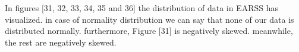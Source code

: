 \documentclass[letterpaper, 10 pt, conference]{ieeeconf}
\begin{document}
\begin{figure}[!ht]
\hfill
{}
\end{figure}

In figures [31, 32, 33, 34, 35 and 36] the distribution of data in EARSS has visualized. in case of normality distribution we can say that none of our data is distributed normally. furthermore, Figure [31] is negatively skewed. meanwhile, the rest are negatively skewed.
\end{document}

